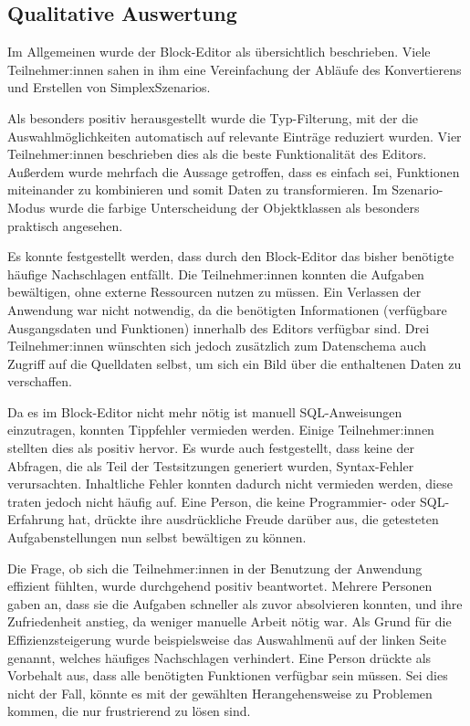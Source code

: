 \subsection{Qualitative Auswertung}
\label{sec:qualitative}

Im Allgemeinen wurde der Block-Editor als übersichtlich beschrieben. Viele Teilnehmer:innen sahen in ihm eine Vereinfachung der Abläufe des Konvertierens und Erstellen von SimplexSzenarios.

Als besonders positiv herausgestellt wurde die Typ-Filterung, mit der die Auswahlmöglichkeiten automatisch auf relevante Einträge reduziert wurden. Vier Teilnehmer:innen beschrieben dies als die beste Funktionalität des Editors. Außerdem wurde mehrfach die Aussage getroffen, dass es einfach sei, Funktionen miteinander zu kombinieren und somit Daten zu transformieren. Im Szenario-Modus wurde die farbige Unterscheidung der Objektklassen als besonders praktisch angesehen.

Es konnte festgestellt werden, dass durch den Block-Editor das bisher benötigte häufige Nachschlagen entfällt. Die Teilnehmer:innen konnten die Aufgaben bewältigen, ohne externe Ressourcen nutzen zu müssen. Ein Verlassen der Anwendung war nicht notwendig, da die benötigten Informationen (verfügbare Ausgangsdaten und Funktionen) innerhalb des Editors verfügbar sind. Drei Teilnehmer:innen wünschten sich jedoch zusätzlich zum Datenschema auch Zugriff auf die Quelldaten selbst, um sich ein Bild über die enthaltenen Daten zu verschaffen.

Da es im Block-Editor nicht mehr nötig ist manuell \ac{SQL}-Anweisungen einzutragen, konnten Tippfehler vermieden werden. Einige Teilnehmer:innen stellten dies als positiv hervor. Es wurde auch festgestellt, dass keine der Abfragen, die als Teil der Testsitzungen generiert wurden, Syntax-Fehler verursachten. Inhaltliche Fehler konnten dadurch nicht vermieden werden, diese traten jedoch nicht häufig auf. Eine Person, die keine Programmier- oder \ac{SQL}-Erfahrung hat, drückte ihre ausdrückliche Freude darüber aus, die getesteten Aufgabenstellungen nun selbst bewältigen zu können.

Die Frage, ob sich die Teilnehmer:innen in der Benutzung der Anwendung effizient fühlten, wurde durchgehend positiv beantwortet. Mehrere Personen gaben an, dass sie die Aufgaben schneller als zuvor absolvieren konnten, und ihre Zufriedenheit anstieg, da weniger manuelle Arbeit nötig war. Als Grund für die Effizienzsteigerung wurde beispielsweise das Auswahlmenü auf der linken Seite genannt, welches häufiges Nachschlagen verhindert. Eine Person drückte als Vorbehalt aus, dass alle benötigten Funktionen verfügbar sein müssen. Sei dies nicht der Fall, könnte es mit der gewählten Herangehensweise zu Problemen kommen, die nur frustrierend zu lösen sind.

